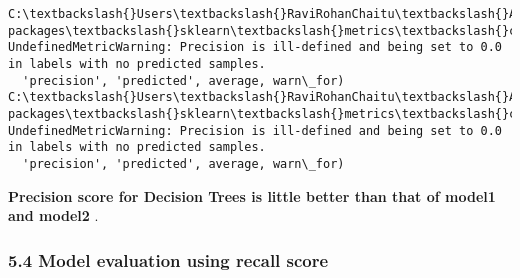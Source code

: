 \documentclass[11pt]{article}
\begin{document}
    \begin{Verbatim}[commandchars=\\\{\}]
C:\textbackslash{}Users\textbackslash{}RaviRohanChaitu\textbackslash{}Anaconda3\textbackslash{}lib\textbackslash{}site-packages\textbackslash{}sklearn\textbackslash{}metrics\textbackslash{}classification.py:1135: UndefinedMetricWarning: Precision is ill-defined and being set to 0.0 in labels with no predicted samples.
  'precision', 'predicted', average, warn\_for)
C:\textbackslash{}Users\textbackslash{}RaviRohanChaitu\textbackslash{}Anaconda3\textbackslash{}lib\textbackslash{}site-packages\textbackslash{}sklearn\textbackslash{}metrics\textbackslash{}classification.py:1135: UndefinedMetricWarning: Precision is ill-defined and being set to 0.0 in labels with no predicted samples.
  'precision', 'predicted', average, warn\_for)

    \end{Verbatim}

    \textbf{Precision score for Decision Trees is little better than that of
model1 and model2 }.

    

    \subsubsection{5.4 Model evaluation using recall
score}\label{model-evaluation-using-recall-score}
\end{document}
